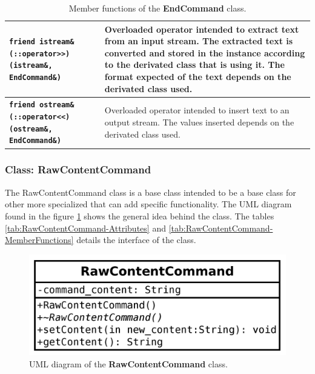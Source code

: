 \documentclass[11pt,twoside,openany,x11names,svgnames]{memoir}
\begin{document}
\begin{table}[h]
\begin{tabular}{| >{\bfseries}p{8.5cm} | p{7cm} |}
	\texttt{friend istream\& (::operator>>) (istream\&, EndCommand\&)} & Overloaded operator intended to extract text from an input stream. The extracted text is converted and stored in the instance according to the derivated class that is using it. The format expected of the text depends on the derivated class used. \\
	
	\hline
	
	\texttt{friend ostream\& (::operator<<) (ostream\&, EndCommand\&)} & Overloaded operator intended to insert text to an output stream. The values inserted depends on the derivated class used. \\	
	
	\hline
\end{tabular}
\caption{Member functions of the \textbf{EndCommand} class.}
\label{tab:EndCommand-MemberFunctions}
\end{table}

\clearpage

\subsubsection{Class: RawContentCommand}\label{Class-RawContentCommand}

The RawContentCommand class is a base class intended to be a base class for other more specialized that can add specific functionality. The UML diagram found in the figure \ref{fig:class-rawcontent-command} shows the general idea behind the class. The tables \ref{tab:RawContentCommand-Attributes} and \ref{tab:RawContentCommand-MemberFunctions} details the interface of the class.

\begin{figure}
	\centering
	\includegraphics[scale=0.2, clip=true, trim= 0pt 0pt 0pt 0pt]{images/chapter03-image30}
	\caption{UML diagram of the \textbf{RawContentCommand} class.}
	\label{fig:class-rawcontent-command}
\end{figure}
\end{document}

